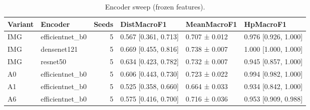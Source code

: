 \begin{table}
\caption{Encoder sweep (frozen features).}
\label{tab:tableS1_encoders}
\begin{tabular}{llrlll}
\toprule
Variant & Encoder & Seeds & DistMacroF1 & MeanMacroF1 & HpMacroF1 \\
\midrule
IMG & efficientnet\_b0 & 5 & 0.567 [0.361, 0.713] & 0.707 ± 0.012 & 0.976 [0.926, 1.000] \\
IMG & densenet121 & 5 & 0.669 [0.455, 0.816] & 0.738 ± 0.007 & 1.000 [1.000, 1.000] \\
IMG & resnet50 & 5 & 0.634 [0.423, 0.782] & 0.732 ± 0.007 & 0.945 [0.857, 1.000] \\
A0 & efficientnet\_b0 & 5 & 0.606 [0.443, 0.730] & 0.723 ± 0.022 & 0.994 [0.982, 1.000] \\
A1 & efficientnet\_b0 & 5 & 0.525 [0.358, 0.660] & 0.664 ± 0.033 & 0.934 [0.842, 1.000] \\
A6 & efficientnet\_b0 & 5 & 0.575 [0.416, 0.700] & 0.716 ± 0.036 & 0.953 [0.909, 0.988] \\
\bottomrule
\end{tabular}
\end{table}
